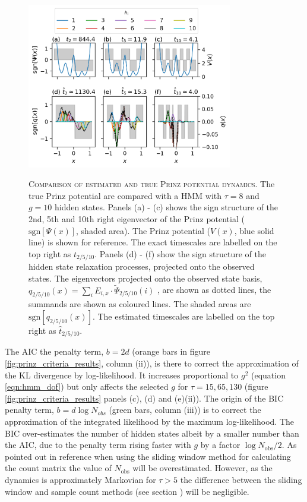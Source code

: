\begin{figure}
    \centering
    \caption[Comparison of estimated and true Prinz potential dynamics]{\textsc{Comparison of estimated and true Prinz potential dynamics}. The true Prinz potential are compared with a HMM with $\tau=8$ and $g=10$ hidden states. Panels (a) - (c) shows the sign structure of the 2nd, 5th and 10th right eigenvector of the Prinz potential ($\mathrm{sgn}[\Psi(x)]$, shaded area). The Prinz potential ($V(x)$, blue solid line) is shown for reference. The exact timescales are labelled on the top right as $t_{2/5/10}$.  Panels (d) - (f) show the sign structure of the hidden state relaxation processes, projected onto the observed states. The eigenvectors projected onto the observed state basis, $q_{2/5/10}(x) = \sum_{i} E_{i, x} \cdot \tilde{\Psi}_{2/5/10}(i)$ , are shown as dotted lines, the summands are shown as coloured lines. The shaded areas are $\mathrm{sgn}[q_{2/5/10}(x)]$. The estimated timescales are labelled on the top right as $\hat{t}_{2/5/10}$. }
    \includegraphics[width=0.8\textwidth]{chapters/hmm_selection/figures/hmm_tau_8_g_10.png}
    \label{fig:prinz_tau8_g10}
\end{figure}

The AIC the penalty term, $b=2d$ (orange bars in figure \ref{fig:prinz_criteria_results}, column (ii)), is there to correct the approximation of the KL divergence by log-likelihood. It increases proportional to $g^{2}$ (equation \ref{eqn:hmm_dof}) but only affects the selected $g$ for $\tau=15, 65, 130$ (figure \ref{fig:prinz_criteria_results} panels (c), (d) and (e)(ii)). The origin of the BIC penalty term, $b=d\log{N_{obs}}$ (green bars, column (iii)) is to correct the approximation of the integrated likelihood by the maximum log-likelihood. The BIC over-estimates the number of hidden states albeit by a smaller number than the AIC, due to the penalty term rising faster with $g$ by a factor $\log{N_{\mathrm{obs}}}/2$. As pointed out in reference \cite{mcgibbonStatisticalModelSelection2014a} when using the sliding window method for calculating the count matrix the value of $N_{\mathrm{obs}}$  will be overestimated. However, as the dynamics is approximately Markovian for $\tau > 5$ the difference between the sliding window and sample count methods (see section \label{sec:theory_count_mat}) will be negligible. 

